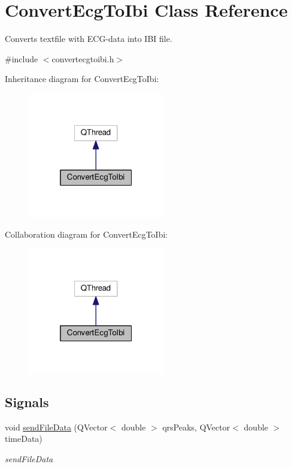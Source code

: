 \hypertarget{classConvertEcgToIbi}{}\section{Convert\+Ecg\+To\+Ibi Class Reference}
\label{classConvertEcgToIbi}


Converts textfile with E\+C\+G-\/data into I\+BI file.  




{\ttfamily \#include $<$convertecgtoibi.\+h$>$}



Inheritance diagram for Convert\+Ecg\+To\+Ibi\+:
\nopagebreak
\begin{figure}[H]
\begin{center}
\leavevmode
\includegraphics[width=169pt]{classConvertEcgToIbi__inherit__graph}
\end{center}
\end{figure}


Collaboration diagram for Convert\+Ecg\+To\+Ibi\+:
\nopagebreak
\begin{figure}[H]
\begin{center}
\leavevmode
\includegraphics[width=169pt]{classConvertEcgToIbi__coll__graph}
\end{center}
\end{figure}
\subsection*{Signals}
\begin{DoxyCompactItemize}
\item 
void \hyperlink{classConvertEcgToIbi_a34d6d61a81e88116c65a2ba9198b7f1c}{send\+File\+Data} (Q\+Vector$<$ double $>$ qrs\+Peaks, Q\+Vector$<$ double $>$ time\+Data)
\begin{DoxyCompactList}\small\item\em send\+File\+Data \end{DoxyCompactList}\end{DoxyCompactItemize}
